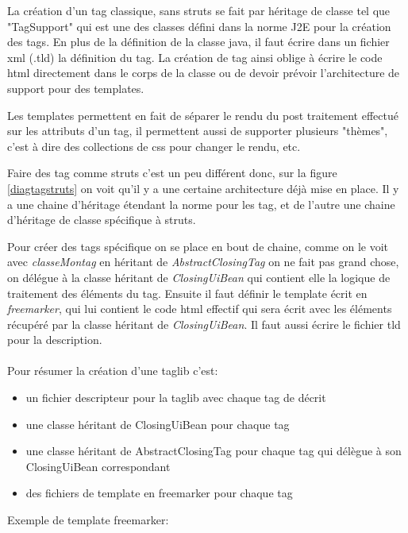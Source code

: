 La création d'un tag classique, sans struts se fait par héritage de classe 
tel que "TagSupport" qui est une des classes défini dans la norme J2E pour la 
création des tags. En plus de la définition de la classe java, il faut écrire
dans un fichier xml (.tld) la définition du tag. La création de tag ainsi oblige
à écrire le code html directement dans le corps de la classe ou de devoir prévoir
l'architecture de support pour des templates.

Les templates permettent en fait de séparer le rendu du post traitement effectué
sur les attributs d'un tag, il permettent aussi de supporter plusieurs "thèmes", 
c'est à dire des collections de css pour changer le rendu, etc.

Faire des tag comme struts c'est un peu différent donc, sur la figure \ref{diagtagstruts} 
on voit qu'il y a une certaine architecture déjà mise en place. Il y a une chaine 
d'héritage étendant la norme pour les tag, et de l'autre une chaine d'héritage 
de classe spécifique à struts. 

Pour créer des tags spécifique on se place en bout de chaine, comme on le voit 
avec \emph{classeMontag} en héritant de \emph{AbstractClosingTag} on ne fait pas
grand chose, on délégue à la classe héritant de \emph{ClosingUiBean} qui contient 
elle la logique de traitement des éléments du tag. Ensuite il faut définir le
template écrit en \emph{freemarker}, qui lui contient le code html effectif 
qui sera écrit avec les éléments récupéré par la classe héritant de \emph{ClosingUiBean}.
Il faut aussi écrire le fichier tld pour la description.\\
\\
Pour résumer la création d'une taglib c'est:

\begin{itemize}
\item un fichier descripteur pour la taglib avec chaque tag de décrit 
\item une classe héritant de ClosingUiBean pour chaque tag
\item une classe héritant de AbstractClosingTag pour chaque tag qui délègue à son ClosingUiBean correspondant
\item des fichiers de template en freemarker pour chaque tag
\end{itemize}

Exemple de template freemarker:

